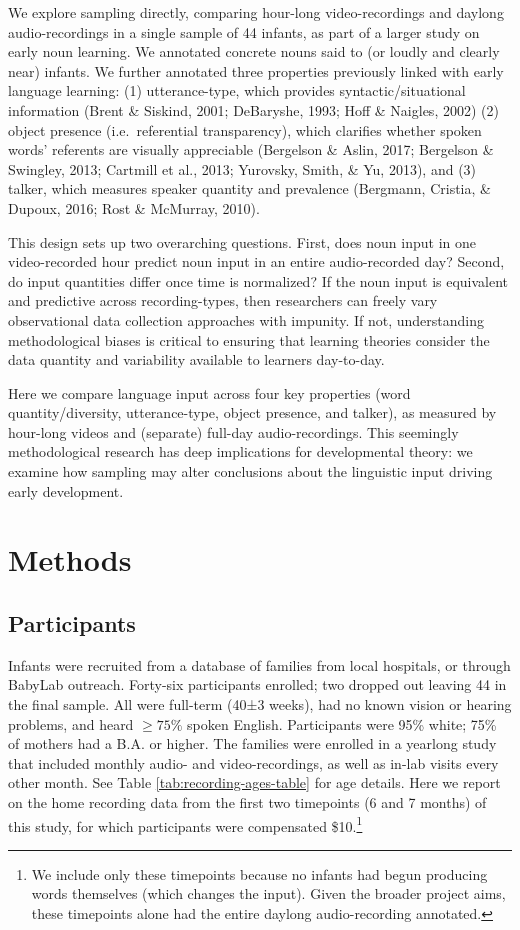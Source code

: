 \documentclass[man]{apa6}
\theoremstyle{definition}
\theoremstyle{definition}
\theoremstyle{definition}
\theoremstyle{remark}
\begin{document}
We explore sampling directly, comparing hour-long video-recordings and
daylong audio-recordings in a single sample of 44 infants, as part of a
larger study on early noun learning. We annotated concrete nouns said to
(or loudly and clearly near) infants. We further annotated three
properties previously linked with early language learning: (1)
utterance-type, which provides syntactic/situational information (Brent
\& Siskind, 2001; DeBaryshe, 1993; Hoff \& Naigles, 2002) (2) object
presence (i.e.~referential transparency), which clarifies whether spoken
words' referents are visually appreciable (Bergelson \& Aslin, 2017;
Bergelson \& Swingley, 2013; Cartmill et al., 2013; Yurovsky, Smith, \&
Yu, 2013), and (3) talker, which measures speaker quantity and
prevalence (Bergmann, Cristia, \& Dupoux, 2016; Rost \& McMurray, 2010).

This design sets up two overarching questions. First, does noun input in
one video-recorded hour predict noun input in an entire audio-recorded
day? Second, do input quantities differ once time is normalized? If the
noun input is equivalent and predictive across recording-types, then
researchers can freely vary observational data collection approaches
with impunity. If not, understanding methodological biases is critical
to ensuring that learning theories consider the data quantity and
variability available to learners day-to-day.

Here we compare language input across four key properties (word
quantity/diversity, utterance-type, object presence, and talker), as
measured by hour-long videos and (separate) full-day audio-recordings.
This seemingly methodological research has deep implications for
developmental theory: we examine how sampling may alter conclusions
about the linguistic input driving early development.

\section{Methods}\label{methods}

\subsection{Participants}\label{participants}

Infants were recruited from a database of families from local hospitals,
or through BabyLab outreach. Forty-six participants enrolled; two
dropped out leaving 44 in the final sample. All were full-term (40±3
weeks), had no known vision or hearing problems, and heard \(\geq 75\%\)
spoken English. Participants were 95\% white; 75\% of mothers had a B.A.
or higher. The families were enrolled in a yearlong study that included
monthly audio- and video-recordings, as well as in-lab visits every
other month. See Table \ref{tab:recording-ages-table} for age details.
Here we report on the home recording data from the first two timepoints
(6 and 7 months) of this study, for which participants were compensated
\$10.\footnote{We include only these timepoints because no infants had begun producing words themselves (which changes the input). Given the broader project aims, these timepoints alone had the entire daylong audio-recording annotated.}
\end{document}
